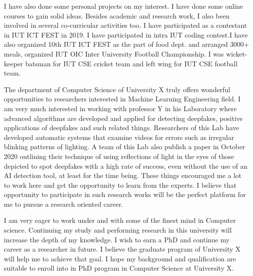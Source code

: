 \documentclass[11pt, a4paper]{article}
\begin{document}
\noindent I have also done some personal projects on my interest. I have done  some online courses to gain solid ideas. Besides academic and research work, I also been involved in several co-curricular activities too. I have participated as a contestant in IUT ICT FEST in 2019. I have participated in intra IUT coding contest.I have also organized 10th IUT ICT FEST as the part of food dept. and arranged 3000+ meals, organized IUT OIC Inter University Football Championship. I was wicket-keeper batsman for IUT CSE cricket team and left wing for IUT CSE football team. \vspace{.5cm}

\noindent The department of Computer Science of University X truly offers wonderful opportunities to researchers interested in Machine Learning Engineering field. I am very much interested in working with professor Y in his Laboratory where advanced algorithms are developed and applied for detecting deepfakes, positive applications of deepfakes and such related things. Researchers of this Lab have developed automatic systems that examine videos for errors such as irregular blinking patterns of lighting. A team of this Lab also publish a paper in October 2020 outlining their technique of using reflections of light in the eyes of those depicted to spot deepfakes with a high rate of success, even without the use of an AI detection tool, at least for the time being. These things encouraged me a lot to work here and get the opportunity to learn from the experts. I believe that opportunity to participate in such research works will be the perfect platform for me to pursue a research oriented career. \vspace{.5cm}


\noindent I am very eager to work under and with some of the finest mind in Computer science. Continuing my study and performing research in this university will increase the depth of my knowledge. I wish to earn a PhD and continue my career as a researcher in future. I believe the graduate program of University X will help me to achieve that goal. I hope my background and qualification are suitable to enroll into in PhD program in Computer Science at University X.
\end{document}
